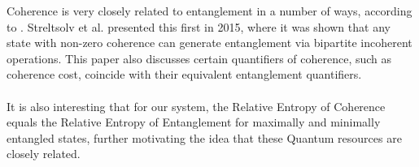 \documentclass[12pt]{article}
\begin{document}
Coherence is very closely related to entanglement in a number of ways, according to \cite{...}. Streltsolv et al.\cite{...} presented this first in 2015, where it was shown that any state with non-zero coherence can generate entanglement via bipartite incoherent operations. This paper\cite{...} also discusses certain quantifiers of coherence, such as coherence cost, coincide with their equivalent entanglement quantifiers.\\
\\
It is also interesting that for our system, the Relative Entropy of Coherence equals the Relative Entropy of Entanglement for maximally and minimally entangled states, further motivating the idea that these Quantum resources are closely related.

\newpage
 
 
\end{document}
